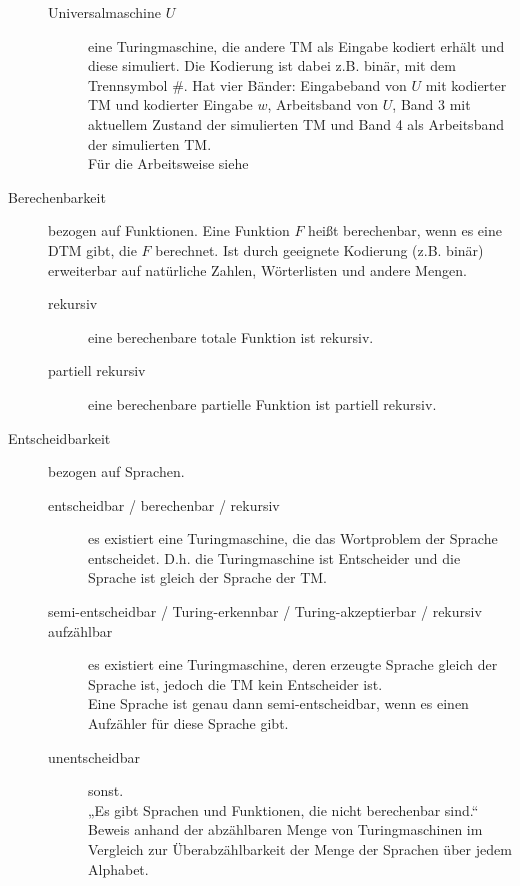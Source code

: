 \begin{description}
\begin{description}
                \item[Universalmaschine $U$] eine Turingmaschine, die andere TM als Eingabe kodiert erhält und diese simuliert. Die Kodierung ist dabei z.B. binär, mit dem Trennsymbol $\#$. Hat vier Bänder: Eingabeband von $U$ mit kodierter TM und kodierter Eingabe $w$, Arbeitsband von $U$, Band 3 mit aktuellem Zustand der simulierten TM und Band 4 als Arbeitsband der simulierten TM. \\ Für die Arbeitsweise siehe 
            \end{description}

        \item[Berechenbarkeit] bezogen auf Funktionen. Eine Funktion $F$ heißt berechenbar, wenn es eine DTM gibt, die $F$ berechnet. Ist durch geeignete Kodierung (z.B. binär) erweiterbar auf natürliche Zahlen, Wörterlisten und andere Mengen. 
            \begin{description}
                \item[rekursiv] eine berechenbare totale Funktion ist rekursiv.
                \item[partiell rekursiv] eine berechenbare partielle Funktion ist partiell rekursiv.
            \end{description}

        \item[Entscheidbarkeit] bezogen auf Sprachen. 
            \begin{description}
                \item[entscheidbar / berechenbar / rekursiv] es existiert eine Turingmaschine, die das Wortproblem der Sprache entscheidet. D.h. die Turingmaschine ist Entscheider und die Sprache ist gleich der Sprache der TM.
                \item[semi-entscheidbar / Turing-erkennbar / Turing-akzeptierbar / rekursiv aufzählbar] es existiert eine Turingmaschine, deren erzeugte Sprache gleich der Sprache ist, jedoch die TM kein Entscheider ist. \\
                Eine Sprache ist genau dann semi-entscheidbar, wenn es einen Aufzähler für diese Sprache gibt.
                \item[unentscheidbar] sonst. \\
                    „Es gibt Sprachen und Funktionen, die nicht berechenbar sind.“ Beweis anhand der abzählbaren Menge von Turingmaschinen im Vergleich zur Überabzählbarkeit der Menge der Sprachen über jedem Alphabet.
            \end{description}


\end{description}
